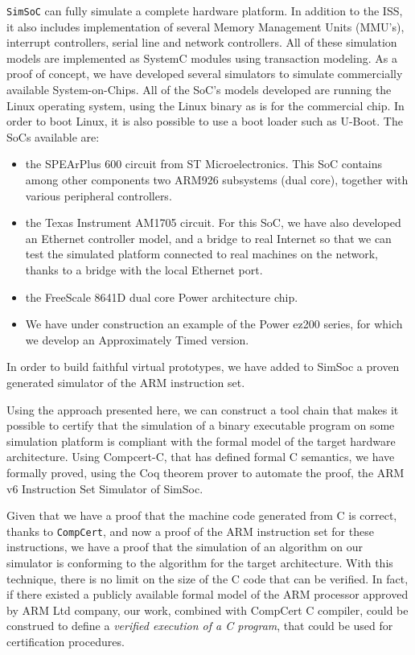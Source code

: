 \documentclass{llncs}
\newcommand{\compcert}{\texttt{CompCert}\xspace}
\newcommand{\simsoc}{\texttt{SimSoC}\xspace}
\begin{document}
\simsoc can fully simulate a complete hardware platform. In addition
to the ISS, it also includes implementation of several Memory
Management Units (MMU's), interrupt controllers, serial line and
network controllers.  All of these simulation models are implemented
as SystemC modules using transaction modeling. As a proof of concept,
we have developed several simulators to simulate commercially
available System-on-Chips. All of the SoC's models developed are
running the Linux operating system, using the Linux binary as is for
the commercial chip. In order to boot Linux, it is also possible to
use a boot loader such as U-Boot.  The SoCs available are:
\begin{itemize}
\item the SPEArPlus 600 circuit from ST Microelectronics.  This SoC
  contains among other components two ARM926 subsystems (dual core),
  together with various peripheral controllers.
\item the Texas Instrument AM1705 circuit. For this SoC, we have also
  developed an Ethernet controller model, and a bridge to real
  Internet so that we can test the simulated platform connected to
  real machines on the network, thanks to a bridge with the local
  Ethernet port.
\item the FreeScale 8641D dual core Power architecture chip.
\item We have under construction an example of the Power ez200 series,
for which we develop an Approximately Timed version.
\end{itemize}
In order to build faithful virtual prototypes, we have added to SimSoc
a proven generated simulator of the ARM instruction set.

Using the approach presented here, we can construct a tool chain that
makes it possible to certify that the simulation of a binary
executable program on some simulation platform is compliant with the
formal model of the target hardware architecture.  Using Compcert-C,
that has defined formal C semantics, we have formally proved, using
the Coq theorem prover to automate the proof, the ARM v6 Instruction
Set Simulator of SimSoc.

Given that we have a proof that the machine code generated from C is
correct, thanks to \compcert, and now a proof of the ARM instruction
set for these instructions, we have a proof that the simulation of an
algorithm on our simulator is conforming to the algorithm for the
target architecture.  With this technique, there is no limit on the
size of the C code that can be verified.  In fact, if there existed a
publicly available formal model of the ARM processor approved by ARM
Ltd company, our work, combined with CompCert C compiler, could be
construed to define a {\em verified execution of a C program}, that
could be used for certification procedures.
\end{document}

